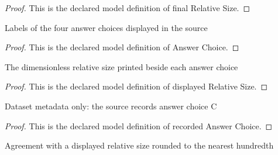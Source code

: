 \begin{proof}
  This is the declared model definition of final Relative Size.
\end{proof}
\begin{definition}
  \label{def:physics:phyx-mini-0144:phyxminiproblems-problemphyxmini0144-answerchoice}
  Labels of the four answer choices displayed in the source
\end{definition}
\begin{proof}
  This is the declared model definition of Answer Choice.
\end{proof}
\begin{definition}
  \label{def:physics:phyx-mini-0144:phyxminiproblems-problemphyxmini0144-displayedrelativesize}
  The dimensionless relative size printed beside each answer choice
\end{definition}
\begin{proof}
  This is the declared model definition of displayed Relative Size.
\end{proof}
\begin{definition}
  \label{def:physics:phyx-mini-0144:phyxminiproblems-problemphyxmini0144-recordedanswerchoice}
  Dataset metadata only: the source records answer choice C
\end{definition}
\begin{proof}
  This is the declared model definition of recorded Answer Choice.
\end{proof}
\begin{definition}
  \label{def:physics:phyx-mini-0144:phyxminiproblems-problemphyxmini0144-matchesdisplayedrelativesize}
  Agreement with a displayed relative size rounded to the nearest hundredth
\end{definition}
